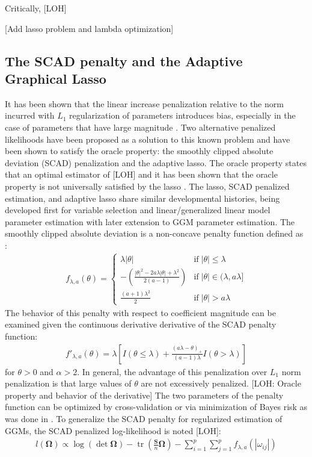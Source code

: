 \documentclass[11pt]{article}
\DeclareMathOperator{\tr}{tr}
\begin{document}
Critically, \cite{friedman2007} [LOH]

[Add lasso problem and lambda optimization]

\subsection{The SCAD penalty and the Adaptive Graphical Lasso}
It has been shown that the linear increase penalization relative to the norm incurred with $L_1$ regularization of parameters introduces bias, especially in the case of parameters that have large magnitude \citep{fan2009,lam2009}. Two alternative penalized likelihoods have been proposed as a solution to this known problem and have been shown to satisfy the oracle property: the smoothly clipped absolute deviation (SCAD) penalization and the adaptive lasso. The oracle property states that an optimal estimator of [LOH] and it has been shown that the oracle property is not universally satisfied by the lasso \citep{zou2006}. The lasso, SCAD penalized estimation, and adaptive lasso share similar developmental histories, being developed first for variable selection and linear/generalized linear model parameter estimation with later extension to GGM parameter estimation. The smoothly clipped absolute deviation is a non-concave penalty function defined as \citep{fan2001}:
\begin{align}
f_{\lambda,a}(\theta)=
\begin{cases} 
\lambda |\theta| & \text{if} \; |\theta|\leq \lambda \\
-\left(\frac{|\theta|^2 -2a \lambda |\theta|+\lambda^2}{2(a-1)}\right)& \text{if}\; |\theta| \in (\lambda,a \lambda] \\
\frac{(a+1)\lambda^2}{2} & \text{if} \; |\theta|>a \lambda 
\end{cases}
\end{align}
The behavior of this penalty with respect to coefficient magnitude can be examined given the continuous derivative derivative of the SCAD penalty function:
\begin{align}
f'_{\lambda,a}(\theta)=\lambda \left[I(\theta \leq \lambda) + \frac{(a \lambda-\theta)_+}{(a-1)\lambda}I(\theta>\lambda)\right]
\end{align}
for $\theta > 0$ and $\alpha>2$. In general, the advantage of this penalization over $L_1$ norm penalization is that large values of $\theta$ are not excessively penalized. [LOH: Oracle property and behavior of the derivative] The two parameters of the penalty function can be optimized by cross-validation or via minimization of Bayes risk as was done in \cite{fan2001}. To generalize the SCAD penalty for regularized estimation of GGMs, the SCAD penalized log-likelihood is noted [LOH]:
\begin{align*}
l(\boldsymbol{\Omega}) \propto \log(\det \boldsymbol{\Omega})-\tr \left(\frac{\textbf{S}}{n} \boldsymbol{\Omega} \right) - \sum_{i=1}^{p} \sum_{j=1}^{p} f_{\lambda,a} (|\omega_{ij}|)
\end{align*}
\end{document}
